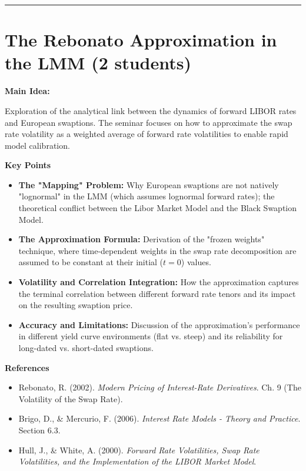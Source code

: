 \documentclass[12pt,a4paper]{article}
\begin{document}
\vspace{0.5cm}
\hrule
\vspace{0.5cm}

\section{The Rebonato Approximation in the LMM (2 students)}

\textbf{Main Idea:}

Exploration of the analytical link between the dynamics of forward LIBOR rates and European swaptions. The seminar focuses on how to approximate the swap rate volatility as a weighted average of forward rate volatilities to enable rapid model calibration.

\medskip
\textbf{Key Points}
\begin{itemize}
\item \textbf{The "Mapping" Problem:} Why European swaptions are not natively "lognormal" in the LMM (which assumes lognormal forward rates); the theoretical conflict between the Libor Market Model and the Black Swaption Model.

\item \textbf{The Approximation Formula:} Derivation of the "frozen weights" technique, where time-dependent weights in the swap rate decomposition are assumed to be constant at their initial ($t=0$) values.

\item \textbf{Volatility and Correlation Integration:} How the approximation captures the terminal correlation between different forward rate tenors and its impact on the resulting swaption price.

\item \textbf{Accuracy and Limitations:} Discussion of the approximation's performance in different yield curve environments (flat vs. steep) and its reliability for long-dated vs. short-dated swaptions.

\end{itemize}

\medskip
\textbf{References}
\begin{itemize}
\item[-] Rebonato, R. (2002). \textit{Modern Pricing of Interest-Rate Derivatives}. Ch. 9 (The Volatility of the Swap Rate).
\item[-] Brigo, D., \& Mercurio, F. (2006). \textit{Interest Rate Models - Theory and Practice}. Section 6.3.
\item[-] Hull, J., \& White, A. (2000). \textit{Forward Rate Volatilities, Swap Rate Volatilities, and the Implementation of the LIBOR Market Model}.
\end{itemize}
\end{document}
